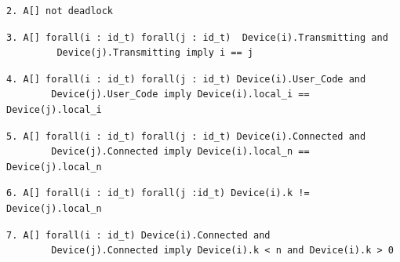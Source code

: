 \begin{lstlisting}[style=UPPAAL, title={The query requires that there is no deadlock in the system.}]
2. A[] not deadlock
\end{lstlisting}

\begin{lstlisting}[style=UPPAAL, title={This requires that if a device \texttt{i}, and a device \texttt{j} are both transmitting, it mean they are the same.}]
3. A[] forall(i : id_t) forall(j : id_t)  Device(i).Transmitting and
		 Device(j).Transmitting imply i == j
\end{lstlisting}
\begin{lstlisting}[style=UPPAAL, title={This query requires that if two devices are both in the location \texttt{User\_Code} they then have the same value of their \texttt{local\_i}}]
4. A[] forall(i : id_t) forall(j : id_t) Device(i).User_Code and 
		Device(j).User_Code imply Device(i).local_i == Device(j).local_i
\end{lstlisting}
\begin{lstlisting}[style=UPPAAL, title={This query requires that if a device \texttt{i} and a device \texttt{j} is both connected, they then have the same value of their \texttt{local\_n}. If they were different it would mean that they are not in the same network, and as such would have different numbers of time-slots in their networks. But the system model makes sure that this is not the case.}]
5. A[] forall(i : id_t) forall(j : id_t) Device(i).Connected and 
		Device(j).Connected imply Device(i).local_n == Device(j).local_n
\end{lstlisting}

\begin{lstlisting}[style=UPPAAL, title={This query requires that if it is always true that all devices never has the the time-slot which one of the devices has locally as the empty-slot. If any device did have this, it would mean that a device was out of sync, since it did not know which time-slot would be the empty one. }]
6. A[] forall(i : id_t) forall(j :id_t) Device(i).k != Device(j).local_n
\end{lstlisting}

\begin{lstlisting}[style=UPPAAL, title={This query says that if a device is connected it has a \texttt{k} value between \texttt{0} and \texttt{n}, which is the number of time-slots in the frame}]
7. A[] forall(i : id_t) Device(i).Connected and 
	 	Device(j).Connected imply Device(i).k < n and Device(i).k > 0
\end{lstlisting}

